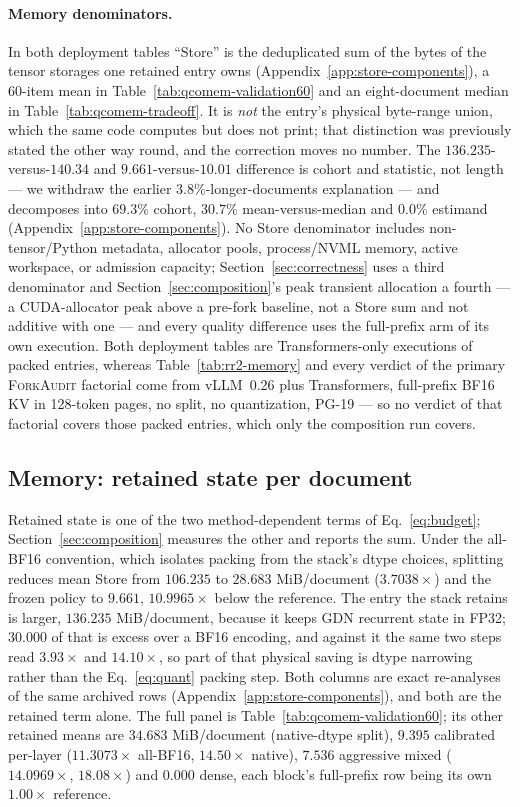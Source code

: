 \documentclass{article}
\newcommand{\method}{\textsc{ForkAudit}}
\begin{document}
\paragraph{Memory denominators.}
\label{sec:denominators}
In both deployment tables ``Store'' is the deduplicated sum of the bytes of the
tensor storages one retained entry owns (Appendix~\ref{app:store-components}), a
60-item mean in Table~\ref{tab:qcomem-validation60} and an eight-document median
in Table~\ref{tab:qcomem-tradeoff}.  It is \emph{not} the entry's physical
byte-range union, which the same code computes but does not print; that
distinction was previously stated the other way round, and the correction moves
no number.  The $136.235$-versus-$140.34$ and $9.661$-versus-$10.01$ difference
is cohort and statistic, not length --- we withdraw the earlier
$3.8\%$-longer-documents explanation --- and decomposes into $69.3\%$ cohort,
$30.7\%$ mean-versus-median and $0.0\%$ estimand
(Appendix~\ref{app:store-components}).  No Store
denominator includes non-tensor/Python metadata, allocator pools, process/NVML
memory, active workspace, or admission capacity;
Section~\ref{sec:correctness} uses a third denominator and
Section~\ref{sec:composition}'s peak transient allocation a fourth --- a
CUDA-allocator peak above a pre-fork baseline, not a Store sum and not additive
with one --- and every quality difference uses the full-prefix arm of its own
execution.  Both deployment tables are Transformers-only executions of packed
entries, whereas Table~\ref{tab:rr2-memory} and every verdict of the primary
\method{} factorial come from vLLM~0.26 plus Transformers, full-prefix BF16 KV in
128-token pages, no split, no quantization, PG-19 --- so no verdict of that
factorial covers those packed entries, which only the composition run covers.
\subsection{Memory: retained state per document}
\label{sec:memory}
Retained state is one of the two method-dependent terms of Eq.~\ref{eq:budget};
Section~\ref{sec:composition} measures the other and reports the sum.  Under the
all-BF16 convention, which isolates packing from the stack's dtype choices,
splitting reduces mean Store from $106.235$ to $28.683$ MiB/document
($3.7038\times$) and the frozen policy to $9.661$, $10.9965\times$ below the
reference.  The entry the
stack retains is larger, $136.235$ MiB/document, because it keeps GDN recurrent
state in FP32; $30.000$ of that is excess over a BF16 encoding, and against it
the same two steps read $3.93\times$ and $14.10\times$, so part of that physical
saving is dtype narrowing rather than the Eq.~\ref{eq:quant} packing step.  Both
columns are exact re-analyses of the same archived rows
(Appendix~\ref{app:store-components}), and both are the retained term alone.
The full panel is Table~\ref{tab:qcomem-validation60}; its other retained means
are $34.683$ MiB/document (native-dtype split), $9.395$ calibrated per-layer
($11.3073\times$ all-BF16, $14.50\times$ native), $7.536$ aggressive mixed
($14.0969\times$, $18.08\times$) and $0.000$ dense, each block's full-prefix
row being its own $1.00\times$ reference.
\end{document}
